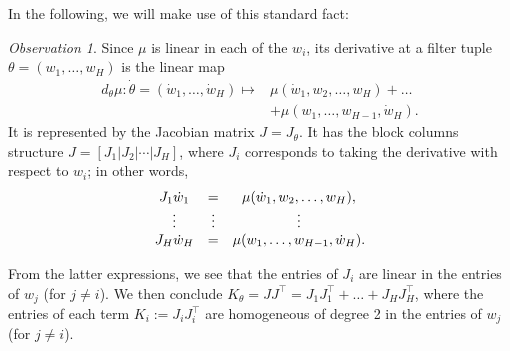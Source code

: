 \documentclass[twoside]{article}
\theoremstyle{definition}
\theoremstyle{remark}
\newtheorem{observation}[theorem]{Observation}
\begin{document}
In the following, we will make use of this  standard fact:
\begin{observation}\label{obs:K}
Since $\mu$ is linear in each of the $w_i$, 
its derivative at a filter tuple $\theta = (w_1, \ldots, w_H)$ is the linear map
\begin{align*}
    d_\theta \mu: \dot \theta = (\dot w_1, \ldots, \dot w_H) \mapsto & \mu(\dot w_1, w_2, \ldots, w_H) + \ldots \\ & + \mu(w_1, \ldots, w_{H-1}, \dot w_H).
\end{align*}
It is represented by the Jacobian matrix $J = J_\theta$.
It has the block columns structure 
$J = [J_1 | J_2 | \cdots | J_H]$, where $J_i$ corresponds to taking the derivative with respect to $w_i$; in other words,  
$$\begin{array}{c c c}
      J_1 \dot w_1 & =&  \mu(\dot w_1, w_2, \ldots, w_H), \\
        \vdots & \vdots & \vdots \\
     J_H \dot w_H & =&  \mu(w_1, \ldots, w_{H-1}, \dot w_H).
\end{array}$$

From the latter expressions, we see that the entries of $J_i$ are linear in the entries of $w_j$ (for $j \neq i$). 
We then conclude $K_\theta = JJ^\top = J_1 J_1^\top + \ldots + J_H J_H^\top$, where the entries of each term $K_i := J_i J_i^\top$ are homogeneous of degree 2 in the entries of $w_j$ (for $j \neq i$).
\end{observation}
\end{document}
